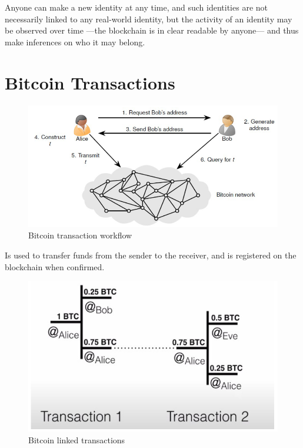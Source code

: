 Anyone can make a new identity at any time, and such identities are not necessarily linked to any real-world identity, but the activity of an identity may be observed over time ---the blockchain is in clear readable by anyone--- and thus make inferences on who it may belong.

\section{Bitcoin Transactions}

\begin{figure}[htbp]
   \centering
   \includegraphics{images/bitcoin_workflow.png}
   \caption{Bitcoin transaction workflow}
   \label{fig:bitcoin_workflow}
\end{figure}

Is used to transfer funds from the sender to the receiver, and is registered on the blockchain when confirmed.

\begin{figure}[htbp]
   \centering
   \includegraphics{images/bitcoin_transaction.png}
   \caption{Bitcoin linked transactions}
   \label{fig:bitcoin_transaction}
\end{figure}

